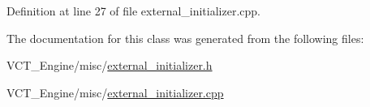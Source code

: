 Definition at line 27 of file external\+\_\+initializer.\+cpp.



The documentation for this class was generated from the following files\+:\begin{DoxyCompactItemize}
\item 
V\+C\+T\+\_\+\+Engine/misc/\hyperlink{external__initializer_8h}{external\+\_\+initializer.\+h}\item 
V\+C\+T\+\_\+\+Engine/misc/\hyperlink{external__initializer_8cpp}{external\+\_\+initializer.\+cpp}\end{DoxyCompactItemize}
